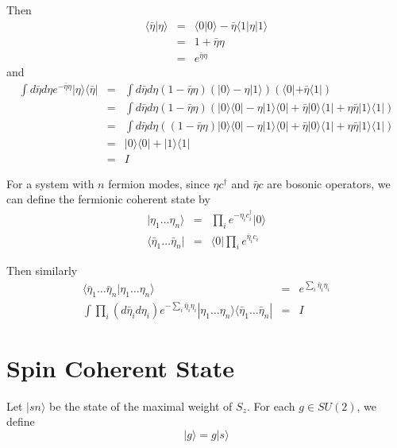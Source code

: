 \documentclass[12pt]{book}
\begin{document}
	Then
	\begin{eqnarray}
		\langle \bar\eta|\eta\rangle&=&\langle 0|0\rangle-\bar\eta\langle 1|\eta|1\rangle\\
		&=&1+\bar\eta\eta\\
		&=&e^{\bar\eta\eta}
	\end{eqnarray}
	and
	\begin{eqnarray}
		\int d\bar\eta d\eta e^{-\bar\eta\eta}|\eta\rangle\langle \bar\eta|&=&\int d\bar\eta d\eta (1-\bar\eta\eta)(|0\rangle-\eta|1\rangle)(\langle 0|+\bar\eta\langle 1|)\\
		&=&\int d\bar\eta d\eta (1-\bar\eta\eta)(|0\rangle\langle 0|-\eta|1\rangle\langle 0|+\bar\eta|0\rangle\langle 1|+\eta\bar\eta|1\rangle\langle 1|)\\
		&=&\int d\bar\eta d\eta ((1-\bar\eta\eta)|0\rangle\langle 0|-\eta|1\rangle\langle 0|+\bar\eta|0\rangle\langle 1|+\eta\bar\eta|1\rangle\langle 1|)\\
		&=&|0\rangle\langle 0|+|1\rangle\langle 1|\\
		&=&I
	\end{eqnarray}
	
	For a system with $n$ fermion modes, since $\eta c^\dagger$ and $\bar\eta c$ are bosonic operators, we can define the fermionic coherent state by
	\begin{eqnarray}
		|\eta_1\dots\eta_n\rangle&=&\prod_ie^{-\eta_i c_i^\dagger}|0\rangle\\
		\langle \bar\eta_1\dots\bar\eta_n|&=&\langle 0|\prod_ie^{\bar\eta_i c_i}
	\end{eqnarray}
	
	Then similarly
	\begin{eqnarray}
		\langle \bar\eta_1\dots\bar\eta_n|\eta_1\dots\eta_n\rangle&=&e^{\sum_i\bar\eta_i\eta_i}\\
		\int \prod_i(d\bar\eta_i d\eta_i) e^{-\sum_i\bar\eta_i\eta_i}|\eta_1\dots\eta_n\rangle\langle \bar\eta_1\dots\bar\eta_n|&=&I
	\end{eqnarray}
	
\section{Spin Coherent State}
	
	Let $|sn\rangle$ be the state of the maximal weight of $S_z$. For each $g\in SU(2)$, we define
	\begin{equation}
		|g\rangle=g|s\rangle
	\end{equation}
	
\end{document}
